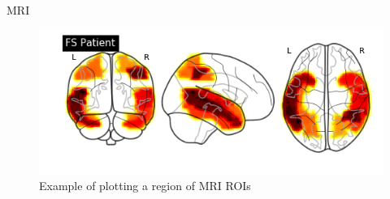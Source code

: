 \documentclass[final]{beamer}
\newlength{\onecolwid}
\newlength{\twocolwid}
\begin{document}
\begin{frame}[t]
\begin{columns}[t]
\begin{column}{\twocolwid}




    \begin{columns}[t,totalwidth=\twocolwid] %
    
        \begin{column}{\onecolwid} %
        
            
            \begin{block}{MRI}
                    
            
            \begin{figure}
                    \includegraphics[width=1.0\linewidth]{images/exampleROI.png}
                    \caption{Example of plotting a region of MRI ROIs}
            \end{figure}\
         

\end{block}
\end{column}
\end{columns}
\end{column}
\end{columns}
\end{frame}
\end{document}
